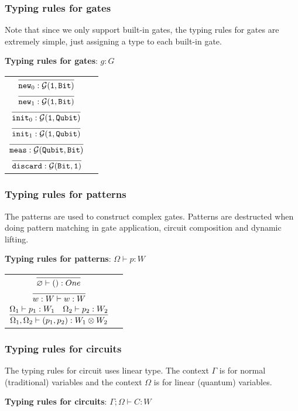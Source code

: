 \subsubsection{Typing rules for gates}
Note that since we only support built-in gates, the typing rules for gates are extremely simple, just assigning a type to each built-in gate.

\noindent \textbf{Typing rules for gates}: $\boxed{g : G}$
\renewcommand\arraystretch{2.5}
\begin{longtable}[c]{cr}
  $ \infer{\new_0 : \calG(\One, \Bit)}{}$ & \\
  $ \infer{\new_1 : \calG(\One, \Bit)}{}$ & \\
  $ \infer{\init_0 : \calG(\One, \Qubit)}{}$ & \\
  $ \infer{\init_1 : \calG(\One, \Qubit)}{}$ & \\
  $ \infer{\meas : \calG(\Qubit, \Bit)}{}$ & \\
  $ \infer{\discard : \calG(\Bit, \One)}{}$ & \\
\end{longtable}

\subsubsection{Typing rules for patterns}
The patterns are used to construct complex gates.
Patterns are destructed when doing pattern matching in gate application, circuit composition and dynamic lifting.

\noindent \textbf{Typing rules for patterns}: $\boxed{\Omega \vdash p : W}$
\renewcommand\arraystretch{2.5}
\begin{longtable}[c]{cr}
  $ \infer{\varnothing \vdash ():One}{}$ & \\
  $ \infer{w:W \vdash w:W}{}$ & \\
  $ \infer{\Omega_1, \Omega_2 \vdash (p_1,p_2):W_1\otimes W_2}{\Omega_1 \vdash p_1 : W_1  &\Omega_2 \vdash p_2 : W_2} $ & \\
\end{longtable}

\subsubsection{Typing rules for circuits}
The typing rules for circuit uses linear type. The context $\Gamma$ is for normal (traditional) variables and the context $\Omega$ is for linear (quantum) variables.

\noindent \textbf{Typing rules for circuits}: $\boxed{\Gamma;\Omega\vdash C:W}$


